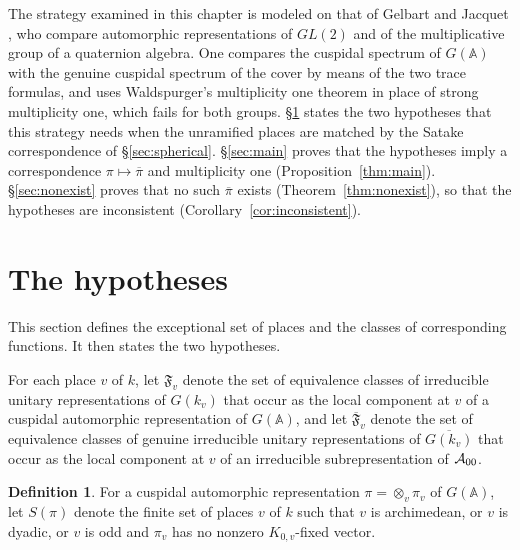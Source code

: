 \documentclass[12pt,letterpaper,openany]{book}
\theoremstyle{plain}
\theoremstyle{definition}
\newtheorem{definition}[theorem]{Definition}
\theoremstyle{remark}
\theoremstyle{remark}
\begin{document}
The strategy examined in this chapter is modeled on that of Gelbart and
Jacquet \cite{GJ}, who compare automorphic representations of $GL(2)$ and
of the multiplicative group of a quaternion algebra. One compares the
cuspidal spectrum of $G({\mathbb A})$ with the genuine cuspidal spectrum of
the cover by means of the two trace formulas, and uses Waldspurger's
multiplicity one theorem in place of strong multiplicity one, which fails
for both groups. \S\ref{sec:hypotheses} states the two hypotheses that this
strategy needs when the unramified places are matched by the Satake
correspondence of \S\ref{sec:spherical}. \S\ref{sec:main} proves that the
hypotheses imply a correspondence $\pi\mapsto\overline\pi$ and
multiplicity one (Proposition~\ref{thm:main}). \S\ref{sec:nonexist} proves
that no such $\overline\pi$ exists (Theorem~\ref{thm:nonexist}), so that
the hypotheses are inconsistent (Corollary~\ref{cor:inconsistent}).

\section{The hypotheses}\label{sec:hypotheses}

This section defines the exceptional set of places and the classes of
corresponding functions. It then states the two hypotheses.

For each place $v$ of $k$, let $\mathfrak{F}_v$ denote the set of
equivalence classes of irreducible unitary representations of $G(k_v)$
that occur as the local component at $v$ of a cuspidal automorphic
representation of $G({\mathbb A})$, and let $\overline{\mathfrak{F}}_v$
denote the set of equivalence classes of genuine irreducible unitary
representations of $\overline{G(k_v)}$ that occur as the local component at
$v$ of an irreducible subrepresentation of ${\cal A}_{00}$.

\begin{definition}\label{def:exceptional}
For a cuspidal automorphic representation $\pi=\otimes_v\pi_v$ of
$G({\mathbb{A}})$, let $S(\pi)$ denote the finite set of places $v$ of $k$
such that $v$ is archimedean, or $v$ is dyadic, or $v$ is odd and $\pi_v$
has no nonzero $K_{0,v}$-fixed vector.
\end{definition}
\end{document}

